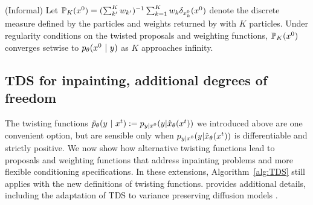 \begin{theorem}\label{prop:twisted_SMC} (Informal) 
Let $\mathbb{P}_{K}(x^{0})=(\sum_{k^\prime}^K w_{k^\prime})^{-1} \sum_{k=1}^K w_k\delta_{x_k^{0}}(x^{0})$ denote the discrete measure defined by the particles and weights returned by  with $K$ particles.
Under regularity conditions on the twisted proposals and weighting functions, $\mathbb{P}_K(x^{0})$
converges setwise to $p_{\theta}(x^{0}~\vert~ y)$ as $K$ approaches infinity.
\end{theorem}






\subsection{TDS for inpainting, additional degrees of freedom}\label{subsec:conditioning-problems}
The twisting functions $\tilde p_\theta(y ~\vert~ x^{t}):=p_{y|x^{0}}({y}|{{\hat x}_\theta(x^{t})})$ we introduced above are one convenient option,
but are sensible only when $p_{y|x^{0}}({y}|{ {\hat x}_\theta(x^{t})})$ is differentiable and strictly positive.
We now show how alternative twisting functions lead to proposals and weighting functions that address inpainting problems and  more flexible conditioning specifications.
In these extensions, Algorithm~\ref{alg:TDS} still applies with the new definitions of twisting functions.
 provides additional details, including the adaptation of TDS to variance preserving diffusion models \citep{ho2020denoising}.



